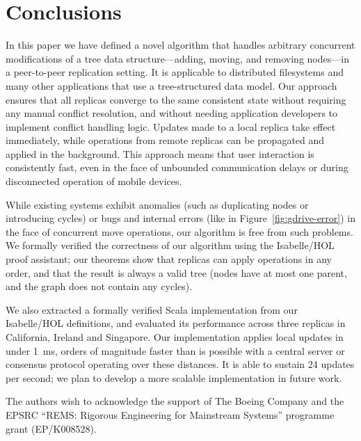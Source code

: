 \documentclass[sigplan,anonymous]{acmart}
\begin{document}
\section{Conclusions}

In this paper we have defined a novel algorithm that handles arbitrary concurrent modifications of a tree data structure---adding, moving, and removing nodes---in a peer-to-peer replication setting.
It is applicable to distributed filesystems and many other applications that use a tree-structured data model.
Our approach ensures that all replicas converge to the same consistent state without requiring any manual conflict resolution, and without needing application developers to implement conflict handling logic.
Updates made to a local replica take effect immediately, while operations from remote replicas can be propagated and applied in the background.
This approach means that user interaction is consistently fast, even in the face of unbounded communication delays or during disconnected operation of mobile devices.

While existing systems exhibit anomalies (such as duplicating nodes or introducing cycles) or bugs and internal errors (like in Figure~\ref{fig:gdrive-error}) in the face of concurrent move operations, our algorithm is free from such problems.
We formally verified the correctness of our algorithm using the Isabelle/HOL proof assistant; our theorems show that replicas can apply operations in any order, and that the result is always a valid tree (nodes have at most one parent, and the graph does not contain any cycles).

We also extracted a formally verified Scala implementation from our Isabelle/HOL definitions, and evaluated its performance across three replicas in California, Ireland and Singapore.
Our implementation applies local updates in under 1~ms, orders of magnitude faster than is possible with a central server or consensus protocol operating over these distances.
It is able to sustain 24 updates per second; we plan to develop a more scalable implementation in future work.

\begin{acks}
The authors wish to acknowledge the support of The Boeing Company and the EPSRC ``REMS: Rigorous Engineering for Mainstream Systems'' programme grant (EP/K008528).
\end{acks}


{}
\end{document}
